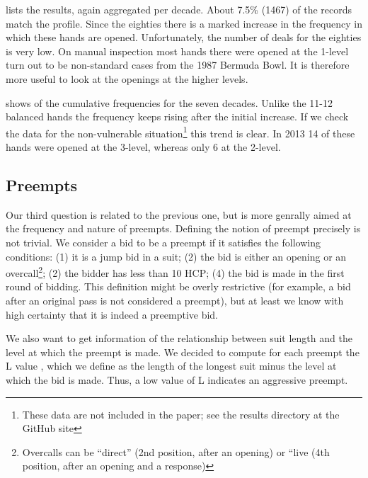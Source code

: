 \documentclass{llncs}
\begin{document}
 lists the results, again aggregated per
decade.  About 7.5\% (1467) of the records match the profile. Since
the eighties there is a marked increase in the frequency in which these
hands are opened.  Unfortunately, the number of deals for the eighties
is very low. On manual inspection most hands there were opened at the
1-level turn out to be non-standard cases from the 1987 Bermuda
Bowl.  It is therefore more useful to look at the openings at the
higher levels.  


 shows of the cumulative
frequencies for the seven decades.  Unlike the 11-12 balanced hands
the frequency keeps rising after the initial increase.  If we check
the data for the non-vulnerable situation\footnote{%
These data are not included in the paper; see the results directory at
the GitHub site} 
this trend is clear. In 2013 14 of these hands were opened at the
3-level, whereas only 6 at the 2-level.   

\subsection{Preempts}

Our third question is related to the previous one, but is more
genrally aimed at the frequency and nature of preempts. Defining the
notion of preempt precisely is not trivial. We consider a bid to be a
preempt if it satisfies the following conditions: (1) it is a jump
bid in a suit; (2) the bid is either an opening or an
overcall\footnote{%
Overcalls can be ``direct'' (2nd position, after an opening) or ``live (4th position,
after an opening and a response)}; 
(2) the bidder has less than 10 HCP; (4) the bid is made in the first
round of bidding.  This definition might be overly restrictive (for
example, a bid after an original pass is not considered a preempt),
but at least we know with high certainty that it is indeed a
preemptive bid. 

We also want to get information of the relationship between suit
length and the level at which the preempt is made. We decided to
compute for each preempt the L value , which we define as the length
of the longest  suit minus the level at which the bid is made.  Thus, a low value of L
indicates an aggressive preempt.  
\end{document}
